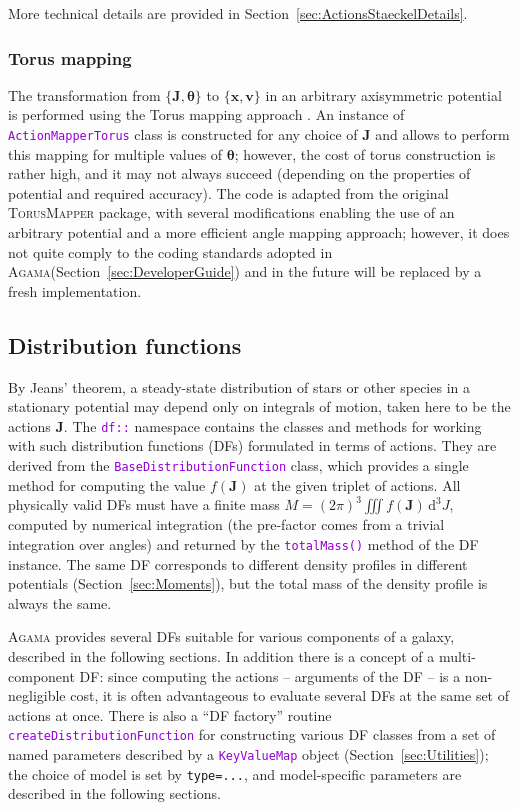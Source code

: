\documentclass[12pt]{article}
\newcommand{\Agama}{\textsc{Agama}\xspace}
\newcommand{\ttt}[1]{\textcolor{darkviolet}{\texttt{#1}}}
\newcommand{\ppp}[1]{\textcolor{darkolive} {\texttt{#1}}}
\renewcommand{\d}{\mathrm{d}}
\newcommand{\bv}{\boldsymbol{v}}
\newcommand{\bx}{\boldsymbol{x}}
\newcommand{\bJ}{\boldsymbol{J}}
\newcommand{\bt}{\boldsymbol{\theta}}
\begin{document}
More technical details are provided in Section~\ref{sec:ActionsStaeckelDetails}.


\subsubsection{Torus mapping}  \label{sec:ActionsTorus}

The transformation from $\{\bJ, \bt\}$ to $\{\bx,\bv\}$ in an arbitrary axisymmetric potential is performed using the Torus mapping approach \cite{BinneyMcMillan2016}. An instance of \ttt{ActionMapperTorus} class is constructed for any choice of $\bJ$ and allows to perform this mapping for multiple values of $\bt$; however, the cost of torus construction is rather high, and it may not always succeed (depending on the properties of potential and required accuracy). The code is adapted from the original \textsc{TorusMapper} package, with several modifications enabling the use of an arbitrary potential and a more efficient angle mapping approach; however, it does not quite comply to the coding standards adopted in \Agama (Section~\ref{sec:DeveloperGuide}) and in the future will be replaced by a fresh implementation. 


\subsection{Distribution functions}  \label{sec:DF}

By Jeans' theorem, a steady-state distribution of stars or other species in a stationary potential may depend only on integrals of motion, taken here to be the actions $\bJ$. The \ttt{df::} namespace contains the classes and methods for working with such distribution functions (DFs) formulated in terms of actions. They are derived from the \ttt{BaseDistributionFunction} class, which provides a single method for computing the value $f(\bJ)$ at the given triplet of actions. All physically valid DFs must have a finite mass $M = (2\pi)^3 \iiint f(\bJ)\,\d ^3J$, computed by numerical integration (the pre-factor comes from a trivial integration over angles) and returned by the \ttt{totalMass()} method of the DF instance.
The same DF corresponds to different density profiles in different potentials (Section~\ref{sec:Moments}), but the total mass of the density profile is always the same.

\Agama provides several DFs suitable for various components of a galaxy, described in the following sections. In addition there is a concept of a multi-component DF: since computing the actions -- arguments of the DF -- is a non-negligible cost, it is often advantageous to evaluate several DFs at the same set of actions at once.
There is also a ``DF factory'' routine \ttt{createDistributionFunction} for constructing various DF classes from a set of named parameters described by a \ttt{KeyValueMap} object (Section~\ref{sec:Utilities}); the choice of model is set by \ppp{type=...}, and model-specific parameters are described in the following sections.
\end{document}
